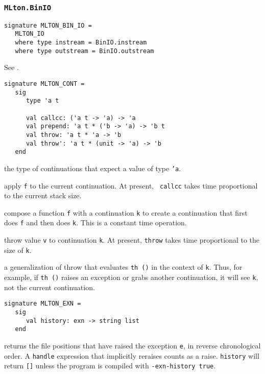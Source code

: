 \subsubsection{{\tt MLton.BinIO}}
\begin{verbatim}
signature MLTON_BIN_IO =
   MLTON_IO
   where type instream = BinIO.instream
   where type outstream = BinIO.outstream
\end{verbatim}

See .


\begin{verbatim}
signature MLTON_CONT =
   sig
      type 'a t

      val callcc: ('a t -> 'a) -> 'a
      val prepend: 'a t * ('b -> 'a) -> 'b t
      val throw: 'a t * 'a -> 'b
      val throw': 'a t * (unit -> 'a) -> 'b
   end
\end{verbatim}

\begin{description}

the type of continuations that expect a value of type {\tt 'a}.

apply {\tt f} to the current continuation.  At present, {\tt
callcc} takes time proportional to the current stack size.

compose a function {\tt f} with a continuation {\tt k} to create a
continuation that first does {\tt f} and then does {\tt k}.  This
is a constant time operation.

throw value {\tt v} to continuation {\tt k}.  At present, {\tt throw}
takes time proportional to the size of {\tt k}.

a generalization of throw that evaluates {\tt th ()} in the context
of {\tt k}.  Thus, for example, if {\tt th ()} raises an exception or
grabs another continuation, it will see {\tt k}, not the current
continuation.

\end{description}

\begin{verbatim}
signature MLTON_EXN =
   sig
      val history: exn -> string list
   end
\end{verbatim}

\begin{description}

returns the file positions that have raised the exception {\tt e}, in reverse
chronological order.   A {\tt handle} expression that implicitly reraises counts
as a raise.  {\tt history} will return {\tt []} unless the program is compiled
with {\tt -exn-history true}.

\end{description}

